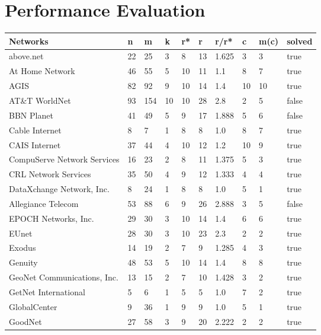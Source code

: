 \documentclass [12pt]{article}
\begin{document}
\section{Performance Evaluation}
\newpage  
\thispagestyle{empty}
\begin{table}[H]
  \begin{tabular}{ | l | l | l | l | l | l | l | l | l | l | }
    \hline
    Networks & n & m &k & r* & r & r/r* & c & m(c) & solved \\ \hline
    above.net & 22 & 25 & 3 & 8 & 13 & 1.625 & 3 & 3 & true\\ \hline
    At Home Network & 46 & 55 & 5 & 10 & 11 & 1.1 & 8 & 7 & true\\ \hline
    AGIS & 82 & 92 & 9 & 10 & 14 & 1.4 & 10 & 10 & true\\ \hline
    AT\&T WorldNet & 93 & 154 & 10 & 10 & 28 & 2.8 & 2 & 5 & false\\ \hline
    BBN Planet & 41 & 49 & 5 & 9 & 17 & 1.888 & 5 & 6 & false\\ \hline
    Cable Internet & 8 & 7 & 1 & 8 & 8 & 1.0 & 8 & 7 & true\\ \hline
    CAIS Internet & 37 & 44 & 4 & 10 & 12 & 1.2 & 10 & 9 & true\\ \hline
    CompuServe Network Services & 16 & 23 & 2 & 8 & 11 & 1.375 & 5 & 3 & true\\ \hline
    CRL Network Services & 35 & 50 & 4 & 9 & 12 & 1.333 & 4 & 4 & true\\ \hline
    DataXchange Network, Inc. & 8 & 24 & 1 & 8 & 8 & 1.0 & 5 & 1 & true\\ \hline
    Allegiance Telecom & 53 & 88 & 6 & 9 & 26 & 2.888 & 3 & 5 & false\\ \hline
    EPOCH Networks, Inc. & 29 & 30 & 3 & 10 & 14 & 1.4 & 6 & 6 & true\\ \hline
    EUnet & 28 & 30 & 3 & 10 & 23 & 2.3 & 2 & 2 & true\\ \hline
    Exodus & 14 & 19 & 2 & 7 & 9 & 1.285 & 4 & 3 & true\\ \hline
    Genuity & 48 & 53 & 5 & 10 & 14 & 1.4 & 8 & 8 & true\\ \hline
    GeoNet Communications, Inc. & 13 & 15 & 2 & 7 & 10 & 1.428 & 3 & 2 & true\\ \hline
    GetNet International & 5 & 6 & 1 & 5 & 5 & 1.0 & 7 & 2 & true\\ \hline
    GlobalCenter & 9 & 36 & 1 & 9 & 9 & 1.0 & 5 & 1 & true\\ \hline
    GoodNet & 27 & 58 & 3 & 9 & 20 & 2.222 & 2 & 2 & true\\ \hline

\end{tabular}
\end{table}
\end{document}
